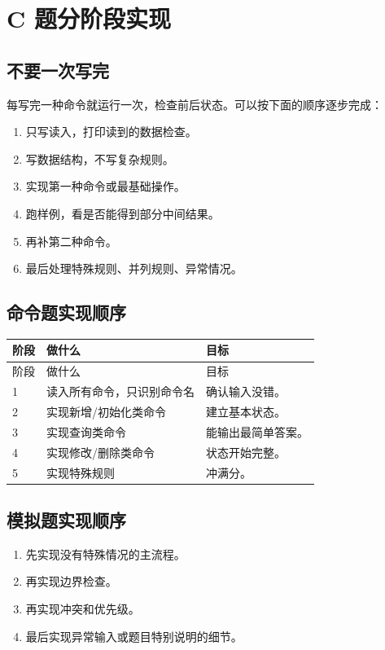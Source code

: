 \section{C 题分阶段实现}\label{sec:07-30}

\subsection{不要一次写完}

每写完一种命令就运行一次，检查前后状态。可以按下面的顺序逐步完成：

\begin{enumerate}
  \item 只写读入，打印读到的数据检查。
  \item 写数据结构，不写复杂规则。
  \item 实现第一种命令或最基础操作。
  \item 跑样例，看是否能得到部分中间结果。
  \item 再补第二种命令。
  \item 最后处理特殊规则、并列规则、异常情况。
\end{enumerate}

\subsection{命令题实现顺序}

\begin{longtable}{p{3cm}p{6cm}p{5cm}}
\toprule
阶段 & 做什么 & 目标 \\
\midrule
\endfirsthead
\toprule
阶段 & 做什么 & 目标 \\
\midrule
\endhead
1 & 读入所有命令，只识别命令名 & 确认输入没错。 \\
2 & 实现新增/初始化类命令 & 建立基本状态。 \\
3 & 实现查询类命令 & 能输出最简单答案。 \\
4 & 实现修改/删除类命令 & 状态开始完整。 \\
5 & 实现特殊规则 & 冲满分。 \\
\bottomrule
\end{longtable}

\subsection{模拟题实现顺序}

\begin{enumerate}
  \item 先实现没有特殊情况的主流程。
  \item 再实现边界检查。
  \item 再实现冲突和优先级。
  \item 最后实现异常输入或题目特别说明的细节。
\end{enumerate}

